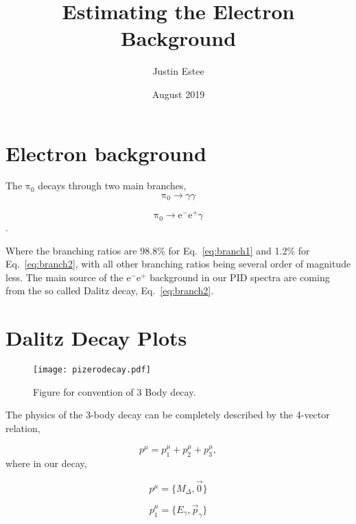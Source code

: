 \documentclass[12pt, letterpaper, twoside]{article}
\title{Estimating the Electron Background}
\author{Justin Estee}
\date{August 2019}
\begin{document}
 
\begin{titlepage}
\maketitle
\end{titlepage}
 
 \newcommand\elec{\mathrm{e^-}}
\newcommand\postr{\mathrm{e^+}}
\newcommand\piz{\mathrm{\pi_0}}

\section{Electron background}
The $\piz$ decays through two main branches, 
\begin{equation}
\piz \rightarrow \gamma\gamma
\label{eq:branch1}
\end{equation} 
 
 \begin{equation}
\piz \rightarrow \elec\postr\gamma
\label{eq:branch2}
\end{equation}.

Where the branching ratios are 98.8\% for Eq.~\ref{eq:branch1} and 1.2\% for Eq.~\ref{eq:branch2}, with all other branching ratios being several order of magnitude less. 
The main source of the $\elec \postr$ background in our PID spectra are coming from the so called Dalitz decay, Eq.~\ref{eq:branch2}.


\section{Dalitz Decay Plots}

\begin{figure}[!htb]
\centering
\texttt{[image: pizerodecay.pdf]}
\label{fig:pizdecay}
\caption{Figure for convention of 3 Body decay.}
\end{figure}

The physics of the 3-body decay can be completely described by the 4-vector relation,

\begin{equation}
p^\mu = p^\mu_1 + p^\mu_2 + p^\mu_3,
\label{eq:dalitz_fourvec}
\end{equation}
where in our decay,

\begin{equation}
p^\mu = \{M_\Delta,\vec{0}\}
\end{equation}

\begin{equation}
p^\mu_1 = \{E_\gamma,\vec{p}_\gamma\}
\end{equation}
\end{document}
